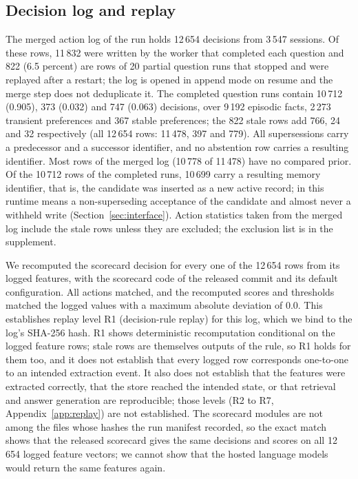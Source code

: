 \subsection{Decision log and replay}
The merged action log of the run holds 12\,654 decisions from 3\,547 sessions. Of these rows, 11\,832 were written by the worker that completed each question and 822 (6.5 percent) are rows of 20 partial question runs that stopped and were replayed after a restart; the log is opened in append mode on resume and the merge step does not deduplicate it. The completed question runs contain 10\,712 \keep{} (0.905), 373 \supersede{} (0.032) and 747 \abstain{} (0.063) decisions, over 9\,192 episodic facts, 2\,273 transient preferences and 367 stable preferences; the 822 stale rows add 766, 24 and 32 respectively (all 12\,654 rows: 11\,478, 397 and 779). All supersessions carry a predecessor and a successor identifier, and no abstention row carries a resulting identifier. Most \keep{} rows of the merged log (10\,778 of 11\,478) have no compared prior. Of the 10\,712 \keep{} rows of the completed runs, 10\,699 carry a resulting memory identifier, that is, the candidate was inserted as a new active record; in this runtime \keep{} means a non-superseding acceptance of the candidate and almost never a withheld write (Section~\ref{sec:interface}). Action statistics taken from the merged log include the stale rows unless they are excluded; the exclusion list is in the supplement.

We recomputed the scorecard decision for every one of the 12\,654 rows from its logged features, with the scorecard code of the released commit and its default configuration. All actions matched, and the recomputed scores and thresholds matched the logged values with a maximum absolute deviation of 0.0. This establishes replay level R1 (decision-rule replay) for this log, which we bind to the log's SHA-256 hash. R1 shows deterministic recomputation conditional on the logged feature rows; stale rows are themselves outputs of the rule, so R1 holds for them too, and it does not establish that every logged row corresponds one-to-one to an intended extraction event. It also does not establish that the features were extracted correctly, that the store reached the intended state, or that retrieval and answer generation are reproducible; those levels (R2 to R7, Appendix~\ref{app:replay}) are not established. The scorecard modules are not among the files whose hashes the run manifest recorded, so the exact match shows that the released scorecard gives the same decisions and scores on all 12\,654 logged feature vectors; we cannot show that the hosted language models would return the same features again.

